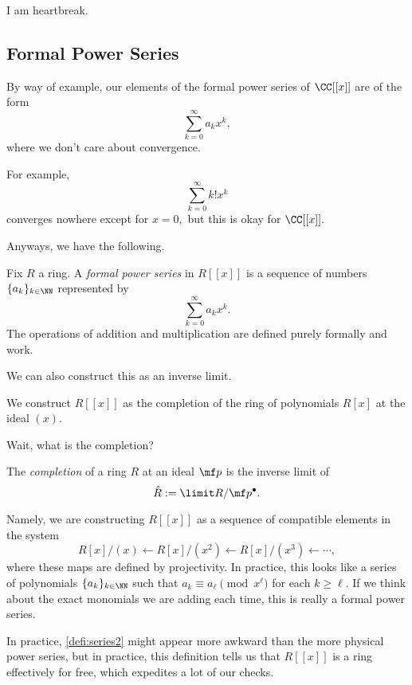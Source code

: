















I am heartbreak.

\subsection{Formal Power Series}
By way of example, our elements of the formal power series of $\CC[[x]]$ are of the form
\[\sum_{k=0}^\infty a_kx^k,\]
where we don't care about convergence.
\begin{example}
	For example,
	\[\sum_{k=0}^\infty k!x^k\]
	converges nowhere except for $x=0,$ but this is okay for $\CC[[x]].$
\end{example}
Anyways, we have the following.
\begin{definition}
	Fix $R$ a ring. A \textit{formal power series} in $R[[x]]$ is a sequence of numbers $\{a_k\}_{k\in\NN}$ represented by
	\[\sum_{k=0}^\infty a_kx^k.\]
	The operations of addition and multiplication are defined purely formally and work.
\end{definition}
We can also construct this as an inverse limit.
\begin{definition} \label{defi:series2}
	We construct $R[[x]]$ as the completion of the ring of polynomials $R[x]$ at the ideal $(x).$
\end{definition}
Wait, what is the completion?
\begin{definition}[Completion]
	The \textit{completion} of a ring $R$ at an ideal $\mf p$ is the inverse limit of
	\[\hat R:=\limit R/\mf p^\bullet.\]
\end{definition}
Namely, we are constructing $R[[x]]$ as a sequence of compatible elements in the system
\[R[x]/(x)\leftarrow R[x]/\left(x^2\right)\leftarrow R[x]/\left(x^3\right)\leftarrow\cdots,\]
where these maps are defined by projectivity. In practice, this looks like a series of polynomials $\{a_k\}_{k\in\NN}$ such that $a_k\equiv a_\ell\pmod{x^\ell}$ for each $k\ge\ell.$ If we think about the exact monomials we are adding each time, this is really a formal power series.
\begin{remark}[Nir]
	In practice, \autoref{defi:series2} might appear more awkward than the more physical power series, but in practice, this definition tells us that $R[[x]]$ is a ring effectively for free, which expedites a lot of our checks.
\end{remark}
